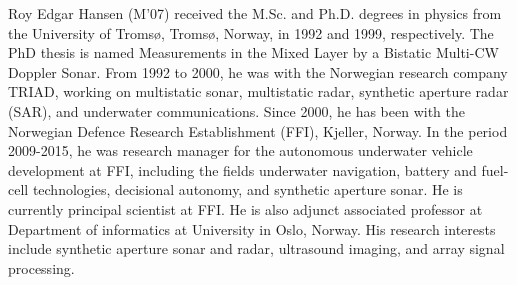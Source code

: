 
\begin{IEEEbiography}{Roy Edgar Hansen} (M'07) received the M.Sc. and Ph.D. degrees in physics from the University of Troms\o, Troms\o, Norway, in 1992 and 1999, respectively.
The PhD thesis is named Measurements in the Mixed Layer by a Bistatic Multi-CW Doppler Sonar. 
From 1992 to 2000, he was with the Norwegian research company TRIAD, working on multistatic sonar, multistatic radar, synthetic aperture radar (SAR), and underwater communications. Since 2000, he has been with the Norwegian Defence Research Establishment (FFI), Kjeller, Norway. 
In the period 2009-2015, he was research manager for the autonomous underwater vehicle development at FFI, including the fields underwater navigation, battery and fuel-cell technologies, decisional autonomy, and synthetic aperture sonar. 
He is currently principal scientist at FFI. 
He is also adjunct associated professor at Department of informatics at University in Oslo, Norway.
His research interests include synthetic aperture sonar and radar, ultrasound imaging, and array signal processing.
\end{IEEEbiography}